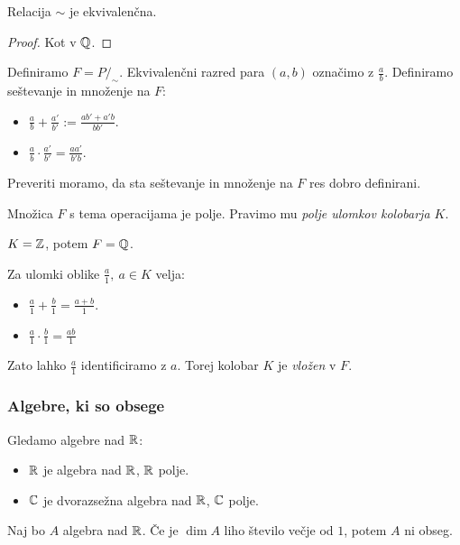 \begin{trditev}
    Relacija $\sim$ je ekvivalenčna.
\end{trditev}

\begin{proof}
    Kot v $\mathbb{Q}$.
\end{proof}

Definiramo $F = P/_\sim$. Ekvivalenčni razred para $(a,b)$ označimo z $\frac{a}{b}$. Definiramo seštevanje in množenje na $F$:
\begin{itemize}
    \item $\frac{a}{b} + \frac{a'}{b'} := \frac{ab' + a'b}{bb'}$.
    \item $\frac{a}{b} \cdot \frac{a'}{b'} = \frac{aa'}{b'b}$.
\end{itemize}
Preveriti moramo, da sta seštevanje in množenje na $F$ res dobro definirani.
\begin{trditev}
    Množica $F$ s tema operacijama je polje. Pravimo mu \emph{polje ulomkov kolobarja $K$}.
\end{trditev}

\begin{primer}
    $K = \mathbb{Z}$, potem $F = \mathbb{Q}$.
\end{primer}

\begin{opomba}
    Za ulomki oblike $\frac{a}{1}, \ a \in K$ velja:
    \begin{itemize}
        \item $\frac{a}{1} + \frac{b}{1} = \frac{a+b}{1}$.
        \item $\frac{a}{1} \cdot \frac{b}{1} = \frac{ab}{1}$
    \end{itemize}
    Zato lahko $\frac{a}{1}$ identificiramo z $a$. Torej kolobar $K$ je \emph{vložen} v $F$.
\end{opomba}

\subsubsection*{Algebre, ki so obsege}
Gledamo algebre nad $\mathbb{R}$:
\begin{itemize}
    \item $\mathbb{R}$ je algebra nad $\mathbb{R}$, $\mathbb{R}$ polje.
    \item $\mathbb{C}$ je dvorazsežna algebra nad $\mathbb{R}$, $\mathbb{C}$ polje.
\end{itemize}

\begin{trditev}
    Naj bo $A$ algebra nad $\mathbb{R}$. Če je $\dim A$ liho število večje od $1$, potem $A$ ni obseg.
\end{trditev}

